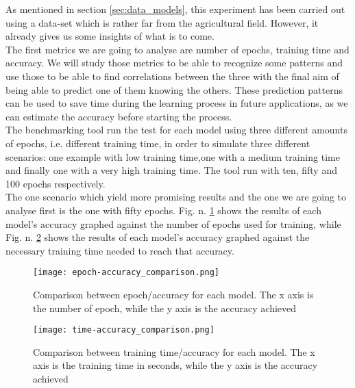 As mentioned in section \ref{sec:data_models}, this experiment has been carried out using a data-set which is rather far from the agricultural field. However, it already gives us some insights of what is to come. \\
The first metrics we are going to analyse are number of epochs, training time and accuracy. We will study those metrics to be able to recognize some patterns and use those to be able to find correlations between the three with the final aim of being able to predict one of them knowing the others. These prediction patterns can be used to save time during the learning process in future applications, as we can estimate the accuracy before starting the process.  \\
The benchmarking tool run the test for each model using three different amounts of epochs, i.e. different training time, in order to simulate three different scenarios: one example with low training time,one with a medium training time and finally one with a very high training time. The tool run with ten, fifty and 100 epochs respectively. \\
The one scenario which yield more promising results and the one we are going to analyse first is the one with fifty epochs. Fig. n. \ref{fig:com_ep_ac_models} shows the results of each model's accuracy graphed against the number of epochs used for training, while  Fig. n. \ref{fig:com_ti_ac_models} shows the results of each model's accuracy graphed against the necessary training time needed to reach that accuracy.\\




\begin{figure}[h]
       \centering 
	    \texttt{[image: epoch-accuracy\_comparison.png]}
        \caption[Comparison between epoch/accuracy for each model]{Comparison between epoch/accuracy for each model. The x axis is the number of epoch, while the y axis is the accuracy achieved}
         \label{fig:com_ep_ac_models}
     \end{figure}
\begin{figure}[h]
\centering 
	    \texttt{[image: time-accuracy\_comparison.png]}
        \caption[Comparison between training time/accuracy for each model]{Comparison between training time/accuracy for each model. The x axis is the training time in seconds, while the y axis is the accuracy achieved}
        \label{fig:com_ti_ac_models}
\end{figure}




